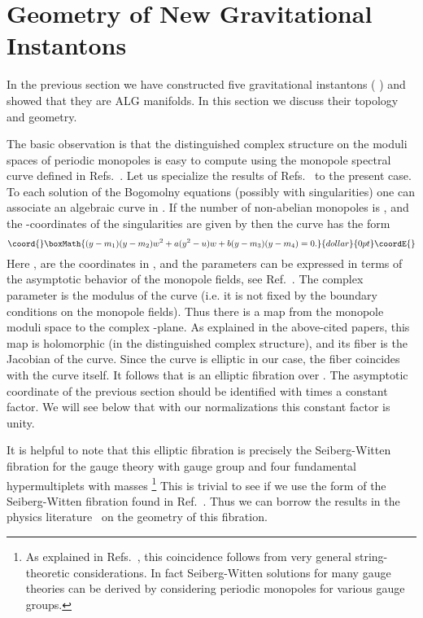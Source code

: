 \documentclass[a4paper,12pt, amsfonts, amssymb]{article}
\providecommand{\CC}{{\mathbb C}}
\begin{document}
\section{Geometry of New Gravitational Instantons}

In the previous section we have constructed five gravitational instantons
(\coordHE{}  \coordHE{})
and showed that they are ALG manifolds. In this section we discuss their
topology and geometry.

The basic observation is that the distinguished complex structure
on the moduli spaces of periodic monopoles is easy to compute using the
monopole spectral curve defined in Refs.~\cite{usone,ustwo}.
Let us specialize the
results of Refs.~\cite{usone,ustwo} to the present case. To each
solution of the \coordHE{} Bogomolny equations (possibly with singularities)
one can associate an algebraic curve in \myHighlight{$\CC\times \CC^*$}\coordHE{}. If the number
of non-abelian monopoles is \coordHE{}, and the \coordHE{}-coordinates of the singularities
are given by \coordHE{} then the curve has the form
$$\coord{}\boxMath{
(y-m_1)(y-m_2)w^2+a(y^2-u)w+b(y-m_3)(y-m_4)=0.
}{dollar}{0pt}\coordE{}$$
Here \myHighlight{$y\in\CC$}\coordHE{}, \myHighlight{$w\in\CC^*$}\coordHE{} are the coordinates in \myHighlight{$\CC\times\CC^*$}\coordHE{}, and the parameters \myHighlight{$a,b\in\CC^*$}\coordHE{} can be expressed in terms of the asymptotic behavior of the monopole fields, see Ref.~\cite{ustwo}.
The complex parameter \coordHE{} is the modulus of the curve (i.e. it is not fixed
by the boundary conditions on the monopole fields).
Thus there is a map from the monopole moduli space \coordHE{} to the complex
\coordHE{}-plane. As explained in the above-cited papers, this map is holomorphic (in the distinguished complex structure), and its
fiber is the Jacobian of the curve. Since the curve is elliptic in our case,
the fiber coincides with the curve itself. It follows that \coordHE{} is an
elliptic fibration over \myHighlight{$\CC$}\coordHE{}. The asymptotic
coordinate \coordHE{} of the previous section should be identified with \coordHE{}
times a constant factor. We will see below that with our normalizations
this constant factor is unity.

It is helpful to note that this elliptic fibration is precisely
the Seiberg-Witten fibration for the \coordHE{}  \coordHE{} gauge theory with gauge group \coordHE{} and four fundamental hypermultiplets with masses
\coordHE{}\footnote{As explained in Refs.~\cite{usone,ustwo}, this coincidence follows from very general string-theoretic considerations. In fact
Seiberg-Witten solutions for many gauge theories can be derived by considering
periodic monopoles for various gauge groups.}
This is trivial to see if we use the form of the Seiberg-Witten fibration
found in Ref.~\cite{Witten}. Thus we can borrow the results
in the physics literature~\cite{SW1,SW2,APSW} on the geometry of this fibration.
\end{document}
